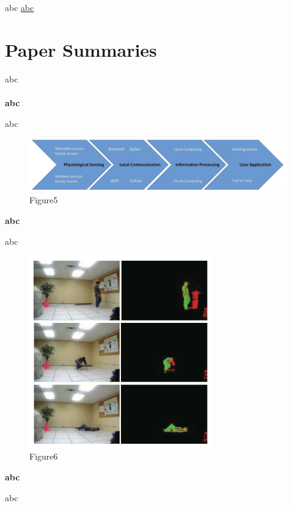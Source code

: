 \documentclass[12pt]{article}
\begin{document}
\noindent abc
\url{abc}

\section{Paper Summaries}

abc
\\ \hspace*{\fill} \\
\textbf{abc}

\noindent abc

\begin{figure}[H]
\centering
\includegraphics[width=1\textwidth]{Paper1.pic.jpg}
\caption{Figure5} 
\end{figure}

\noindent \textbf{abc}

\noindent abc

\begin{figure}[H]
\centering
\includegraphics[width=0.7\textwidth]{Paper2.pic.jpg}
\caption{Figure6} 
\end{figure}

\noindent \textbf{abc}

\noindent abc
\end{document}
